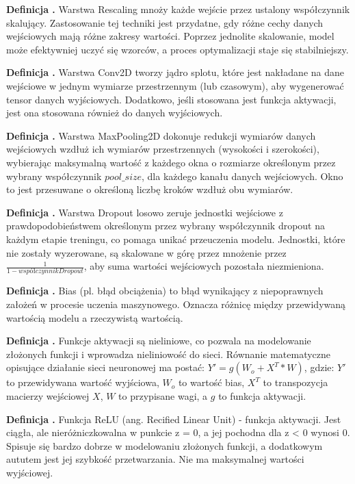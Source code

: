 \noindent
\textbf{Definicja \mlDefinitionIndex.}
\incrementMlDefinitionIndex
Warstwa Rescaling mnoży każde wejście przez ustalony współczynnik skalujący.
Zastosowanie tej techniki jest przydatne, gdy różne cechy danych wejściowych mają różne zakresy wartości.
Poprzez jednolite skalowanie, model może efektywniej uczyć się wzorców, a proces optymalizacji staje się stabilniejszy.

\noindent
\textbf{Definicja \mlDefinitionIndex.}
\incrementMlDefinitionIndex
Warstwa Conv2D tworzy jądro splotu, które jest nakładane na dane wejściowe w jednym wymiarze przestrzennym (lub czasowym), 
aby wygenerować tensor danych wyjściowych.
Dodatkowo, jeśli stosowana jest funkcja aktywacji, jest ona stosowana również do danych wyjściowych.

\noindent
\textbf{Definicja \mlDefinitionIndex.}
\incrementMlDefinitionIndex
Warstwa MaxPooling2D dokonuje redukcji wymiarów danych wejściowych wzdłuż ich wymiarów przestrzennych (wysokości i szerokości),
wybierając maksymalną wartość z każdego okna o rozmiarze określonym przez wybrany współczynnik $pool\_size$,
dla każdego kanału danych wejściowych.
Okno to jest przesuwane o określoną liczbę kroków wzdłuż obu wymiarów.

\noindent
\textbf{Definicja \mlDefinitionIndex.}
\incrementMlDefinitionIndex
Warstwa Dropout losowo zeruje jednostki wejściowe z prawdopodobieństwem określonym
przez wybrany współczynnik dropout na każdym etapie treningu, co pomaga unikać przeuczenia modelu.
Jednostki, które nie zostały wyzerowane, są skalowane w górę przez mnożenie przez $\frac{1}{1 - współczynnikDropout}$,
aby suma wartości wejściowych pozostała niezmieniona.

\noindent
\textbf{Definicja \mlDefinitionIndex.}
\incrementMlDefinitionIndex
Bias (pl. błąd obciążenia) to błąd wynikający z niepoprawnych założeń w procesie uczenia maszynowego.
Oznacza różnicę między przewidywaną wartością modelu a rzeczywistą wartością.

\noindent
\textbf{Definicja \mlDefinitionIndex.}
\incrementMlDefinitionIndex
Funkcje aktywacji są nieliniowe, co pozwala na modelowanie złożonych funkcji i wprowadza nieliniowość do sieci.
Równanie matematyczne opisujące działanie sieci neuronowej ma postać: $Y' = g(W_o + X^T * W)$, gdzie:
$Y'$ to przewidywana wartość wyjściowa,
$W_o$ to wartość bias,
$X^T$ to transpozycja macierzy wejściowej $X$,
$W$ to przypisane wagi,
a $g$ to funkcja aktywacji.

\noindent
\textbf{Definicja \mlDefinitionIndex.}
\incrementMlDefinitionIndex
Funkcja ReLU (ang. Recified Linear Unit) - funkcja aktywacji.
Jest ciągła, ale nieróżniczkowalna w punkcie z = 0, a jej pochodna dla z < 0 wynosi 0.
Spisuje się bardzo dobrze w modelowaniu złożonych funkcji, a dodatkowym aututem jest jej szybkość przetwarzania.
Nie ma maksymalnej wartości wyjściowej.


